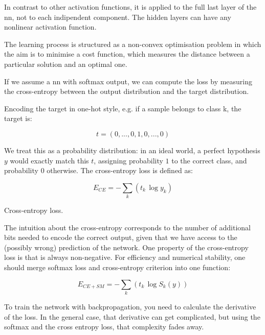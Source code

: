 \noindent In contrast to other activation functions, it is applied to the full last layer of the \gls{nn}, not to each indipendent component. The hidden layers can have any nonlinear activation function.

\noindent The learning process is structured as a non-convex optimisation problem in which the aim is to minimise a cost function, which measures the distance between a particular solution and an optimal one.

\noindent If we assume a \gls{nn} with softmax output, we can compute the loss by measuring the cross-entropy between the output distribution and the target distribution.

\noindent Encoding the target in one-hot style, e.g. if a sample belongs to class k, the target is:

\begin{Equation}[H]
	\centering
	\begin{equation} \label{eq:nnclass3}
		t=(0,...,0,1,0,...,0)
	\end{equation}
\end{Equation}

\noindent We treat this as a probability distribution: in an ideal world, a perfect hypothesis $y$ would exactly match this $t$, assigning probability $1$ to the correct class, and probability $0$ otherwise. The cross-entropy loss is defined as:

\begin{Equation}[H]
	\centering
	\begin{equation} \label{eq:cross-entropy}
		E_{CE} = -\sum_{k}(t_k \, \log y_k)
	\end{equation}
	\caption[Cross-entropy loss.]{Cross-entropy loss.}
\end{Equation}

\noindent The intuition about the cross-entropy corresponds to the number of additional bits needed to encode the correct output, given that we have access to the (possibly wrong) prediction of the network. One property of the cross-entropy loss is that is always non-negative. For efficiency and numerical stability, one should merge softmax loss and cross-entropy criterion into one function:

\begin{Equation}[H]
	\centering
	\begin{equation}
		E_{CE+SM} = -\sum_{k}(t_k \, \log S_k(y))
	\end{equation}
	\caption[Softmax cross entropy.]{To train the network with backpropagation, you need to calculate the derivative of the loss. In the general case, that derivative can get complicated, but using the softmax and the cross entropy loss, that complexity fades away.}
	\label{eq:softmaxcrossentr}
\end{Equation}

